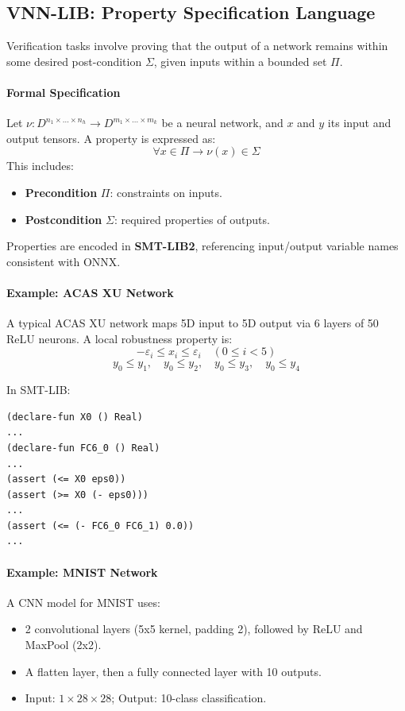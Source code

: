 \subsection{VNN-LIB: Property Specification Language}

Verification tasks involve proving that the output of a network remains within some desired post-condition $\Sigma$, given inputs within a bounded set $\Pi$.

\paragraph{Formal Specification}
Let $\nu: D^{n_1 \times \dots \times n_h} \to D^{m_1 \times \dots \times m_k}$ be a neural network, and $x$ and $y$ its input and output tensors. A property is expressed as:
\[
\forall x \in \Pi \rightarrow \nu(x) \in \Sigma
\]
This includes:
\begin{itemize}
    \item \textbf{Precondition} $\Pi$: constraints on inputs.
    \item \textbf{Postcondition} $\Sigma$: required properties of outputs.
\end{itemize}

Properties are encoded in \textbf{SMT-LIB2}, referencing input/output variable names consistent with ONNX.


\paragraph{Example: ACAS XU Network}

A typical ACAS XU network maps 5D input to 5D output via 6 layers of 50 ReLU neurons. A local robustness property is:
\[
-\varepsilon_i \leq x_i \leq \varepsilon_i \quad (0 \leq i < 5)
\]
\[
y_0 \leq y_1, \quad y_0 \leq y_2, \quad y_0 \leq y_3, \quad y_0 \leq y_4
\]

\noindent In SMT-LIB:
\begin{lstlisting}
(declare-fun X0 () Real)
...
(declare-fun FC6_0 () Real)
...
(assert (<= X0 eps0))
(assert (>= X0 (- eps0)))
...
(assert (<= (- FC6_0 FC6_1) 0.0))
...
\end{lstlisting}

\paragraph{Example: MNIST Network}

A CNN model for MNIST uses:
\begin{itemize}
    \item 2 convolutional layers (5x5 kernel, padding 2), followed by ReLU and MaxPool (2x2).
    \item A flatten layer, then a fully connected layer with 10 outputs.
    \item Input: $1 \times 28 \times 28$; Output: 10-class classification.
\end{itemize}

